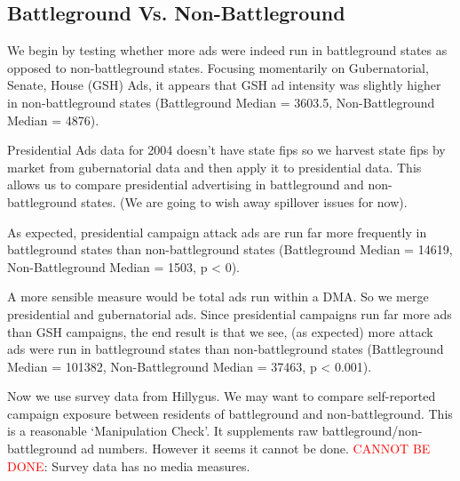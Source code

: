 \documentclass[doc,fignum,noapacite]{apa}
\begin{document}
\subsection{Battleground Vs. Non-Battleground}

We begin by testing whether more ads were indeed run in battleground states as opposed to non-battleground states.
Focusing momentarily on Gubernatorial, Senate, House (GSH) Ads, it appears that GSH ad intensity was slightly 
higher in non-battleground states (Battleground Median = 3603.5, 
Non-Battleground Median = 4876). 

Presidential Ads data for 2004 doesn't have state fips so we harvest state fips by market from gubernatorial data 
and then apply it to presidential data. This allows us to compare presidential advertising in battleground and 
non-battleground states. (We are going to wish away spillover issues for now).

As expected, presidential campaign attack ads are run far more frequently in battleground states than 
non-battleground states (Battleground Median = 14619, 
Non-Battleground Median = 1503, 
p < 0).

A more sensible measure would be total ads run within a DMA. So we merge presidential and gubernatorial ads. Since 
presidential campaigns run far more ads than GSH campaigns, the end result is that we see, (as expected) more attack 
ads were run in battleground states than non-battleground states 
(Battleground Median = 101382, 
Non-Battleground Median = 37463, 
p < 0.001).

Now we use survey data from Hillygus. We may want to compare self-reported campaign exposure between residents of 
battleground and non-battleground. This is a reasonable `Manipulation Check'. It supplements raw 
battleground/non-battleground ad numbers. However it seems it cannot be done. 
\textcolor{red}{CANNOT BE DONE}: Survey data has no media measures.
\end{document}
